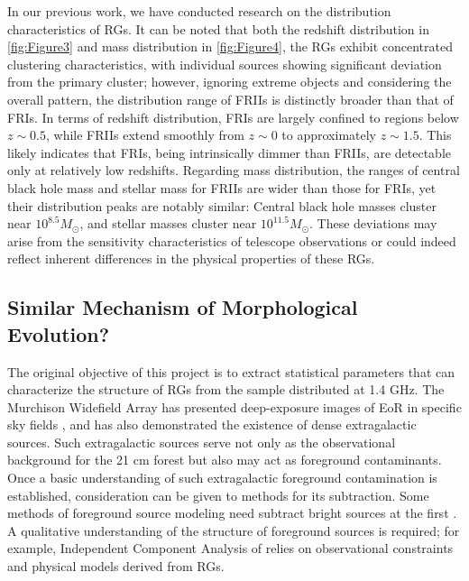 \documentclass{aa}
\begin{document}


In our previous work, we have conducted research on the distribution characteristics of RGs. It can be noted that both the redshift distribution in \autoref{fig:Figure3} and mass distribution in \autoref{fig:Figure4}, the RGs exhibit concentrated clustering characteristics, with individual sources showing significant deviation from the primary cluster; however, ignoring extreme objects and considering the overall pattern, the distribution range of FRIIs is distinctly broader than that of FRIs. In terms of redshift distribution, FRIs are largely confined to regions below $z \sim 0.5$, while FRIIs extend smoothly from $z \sim 0$ to approximately $z \sim 1.5$. This likely indicates that FRIs, being intrinsically dimmer than FRIIs, are detectable only at relatively low redshifts. Regarding mass distribution, the ranges of central black hole mass and stellar mass for FRIIs are wider than those for FRIs, yet their distribution peaks are notably similar: Central black hole masses cluster near $10^{8.5} M_\odot$, and stellar masses cluster near $10^{11.5} M_\odot$. These deviations may arise from the sensitivity characteristics of telescope observations or could indeed reflect inherent differences in the physical properties of these RGs.



\subsection{Similar Mechanism of Morphological Evolution?}\label{sec:Section5_2}
The original objective of this project is to extract statistical parameters that can characterize the structure of RGs from the sample distributed at 1.4 GHz. The Murchison Widefield Array has presented deep-exposure images of EoR in specific sky fields \citep{offringa_parametrizing_2016}, and has also demonstrated the existence of dense extragalactic sources. Such extragalactic sources serve not only as the observational background for the 21 cm forest but also may act as foreground contaminants. Once a basic understanding of such extragalactic foreground contamination is established, consideration can be given to methods for its subtraction. Some methods of foreground source modeling need subtract bright sources at the first \citep{di_matteo_radio_2002,di_matteo_21-cm_2004}.  A qualitative understanding of the structure of foreground sources is required; for example, Independent Component Analysis of \cite{chapman_foreground_2012} relies on observational constraints and physical models derived from RGs. 
\end{document}
